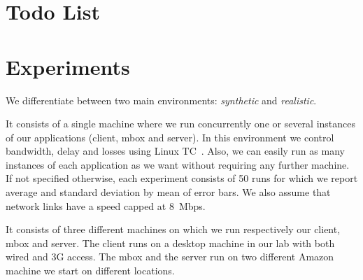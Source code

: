 \documentclass{article}
\begin{document}
\newcommand{\fig}{{Figure}}
\newcommand{\eg}{{e.g.,}}
\newcommand{\ie}{{\it i.e.,}}


\newcommand{\exclude}[1]{}
\newcommand{\showComments}{yes}  %
\newcommand{\note}[2]{
    \ifthenelse{\equal{\showComments}{yes}}{\textcolor{#1}{#2}}{}
}
\newcommand{\TODO}[1]{%
    \addcontentsline{tdo}{todo}{\protect{#1}}%
    \note{red}{TODO: #1} 
}
\newcommand{\question}[2]{\paragraph{Q: #1}\\\textit{A: #2}}
\makeatletter \newcommand{\listoftodos}
{\section*{Todo List} }
\newcommand{\l@todo}
{\@dottedtocline{1}{0em}{2.3em}} \makeatother

\newcommand{\spp}{TruMP\xspace}
\newcommand{\tcpmode}{\texttt{NoEncrypt}\xspace}
\newcommand{\etemode}{\texttt{E2E-TLS}\xspace}
\newcommand{\splitmode}{\texttt{SplitTLS}\xspace}
\newcommand{\sppmode}{\texttt{\spp}\xspace}

\section{Experiments}
We differentiate between two main environments: \emph{synthetic} and
\emph{realistic}. 

 It consists of a single machine
where we run concurrently one or several instances of our applications
(client, mbox and server). In this environment we control bandwidth,
delay and losses using Linux TC~\cite{tc}. Also, we can easily run as
many instances of each application as we want without requiring any
further machine. If not specified otherwise, each experiment consists
of 50 runs for which we report average and standard deviation by mean
of error bars. We also assume that network links have a speed capped
at 8~Mbps.

 It consists of three different
machines on which we run respectively our client, mbox and server. The
client runs on a desktop machine in our lab with both wired and 3G
access. The mbox and the server run on two different Amazon machine
we start on different locations. 
\end{document}

